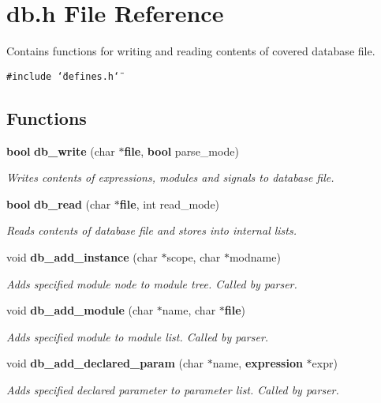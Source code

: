 \section{db.h File Reference}
\label{db_8h}
Contains functions for writing and reading contents of covered database file.  


{\tt \#include \char`\"{}defines.h\char`\"{}}\par
\subsection*{Functions}
\begin{CompactItemize}
\item 
{\bf bool} {\bf db\_\-write} (char $\ast${\bf file}, {\bf bool} parse\_\-mode)
\begin{CompactList}\small\item\em Writes contents of expressions, modules and signals to database file. \item\end{CompactList}\item 
{\bf bool} {\bf db\_\-read} (char $\ast${\bf file}, int read\_\-mode)
\begin{CompactList}\small\item\em Reads contents of database file and stores into internal lists. \item\end{CompactList}\item 
void {\bf db\_\-add\_\-instance} (char $\ast$scope, char $\ast$modname)
\begin{CompactList}\small\item\em Adds specified module node to module tree. Called by parser. \item\end{CompactList}\item 
void {\bf db\_\-add\_\-module} (char $\ast$name, char $\ast${\bf file})
\begin{CompactList}\small\item\em Adds specified module to module list. Called by parser. \item\end{CompactList}\item 
void {\bf db\_\-add\_\-declared\_\-param} (char $\ast$name, {\bf expression} $\ast$expr)
\begin{CompactList}\small\item\em Adds specified declared parameter to parameter list. Called by parser. \item\end{CompactList}\item 

\end{CompactItemize}
